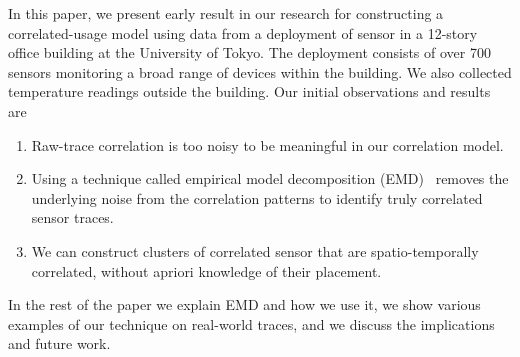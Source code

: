 In this paper, we present early result in our research for constructing a correlated-usage model using data
from a deployment of sensor in a 12-story office building at the University of Tokyo.  The deployment
consists of over 700 sensors monitoring a broad range of devices within the building.  We also collected temperature
readings outside the building.  Our initial observations and results are

\begin{enumerate}
\item Raw-trace correlation is too noisy to be meaningful in our correlation model.
\item Using a technique called empirical model decomposition (EMD)~\cite{huang:emd1998} removes the 
		underlying noise from the correlation patterns to identify truly correlated sensor traces.
\item We can construct clusters of correlated sensor that are spatio-temporally correlated, without
		apriori knowledge of their placement.
\end{enumerate}

In the rest of the paper we explain EMD and how we use it, we show various examples of our technique on real-world
traces, and we discuss the implications and future work.







